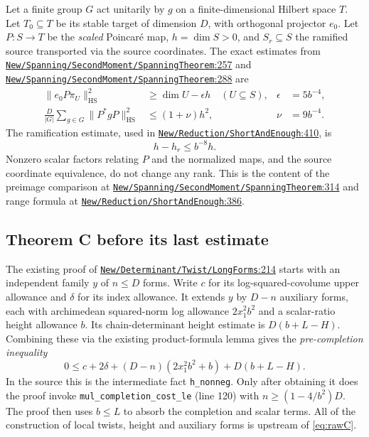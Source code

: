 \documentclass[11pt]{article}
\theoremstyle{remark}\newtheorem{remark}[theorem]{Remark}
\newcommand{\HS}{\mathrm{HS}}
\newcommand{\src}[2]{\href{https://github.com/lsernau/grh-lean/blob/72fead102f663d5c7a407964a13dc0cf9d977207/grh/src/#1.lean\#L#2}{\nolinkurl{#1}:#2}}
\begin{document}
Let a finite group $G$ act unitarily by $g$ on a finite-dimensional Hilbert space $T$. Let $T_0\subseteq T$ be its stable target of dimension $D$, with orthogonal projector $e_0$. Let $P:S\to T$ be the \emph{scaled} Poincar\'e map, $h=\dim S>0$, and $S_r\subseteq S$ the ramified source transported via the source coordinates. The exact estimates from \src{New/Spanning/SecondMoment/SpanningTheorem}{257} and \src{New/Spanning/SecondMoment/SpanningTheorem}{288} are
\begin{align}
\|e_0P\pi_U\|_{\HS}^2&\ge \dim U-\epsilon h \quad(U\subseteq S),&\epsilon&=5b^{-4},\label{eq:neariso}\\
\frac D{|G|}\sum_{g\in G}\|P^*gP\|_{\HS}^2&\le(1+\nu)h^2,&\nu&=9b^{-4}.\label{eq:moment}
\end{align}
The ramification estimate, used in \src{New/Reduction/ShortAndEnough}{410}, is
\begin{equation}\label{eq:ram} h-h_r\le b^{-8}h.\end{equation}
Nonzero scalar factors relating $P$ and the normalized maps, and the source coordinate equivalence, do not change any rank. This is the content of the preimage comparison at \src{New/Spanning/SecondMoment/SpanningTheorem}{314} and range formula at \src{New/Reduction/ShortAndEnough}{386}.

\subsection{Theorem C before its last estimate}
The existing proof of \src{New/Determinant/Twist/LongForms}{214} starts with an independent family $y$ of $n\le D$ forms. Write $c$ for its log-squared-covolume upper allowance and $\delta$ for its index allowance. It extends $y$ by $D-n$ auxiliary forms, each with archimedean squared-norm log allowance $2x_1^2b^2$ and a scalar-ratio height allowance $b$. Its chain-determinant height estimate is $D(b+L-H)$. Combining these via the existing product-formula lemma gives the \emph{pre-completion inequality}
\begin{equation}\label{eq:rawC}
0\le c+2\delta+(D-n)(2x_1^2b^2+b)+D(b+L-H).
\end{equation}
In the source this is the intermediate fact \texttt{h\_nonneg}. Only after obtaining it does the proof invoke \texttt{mul\_completion\_cost\_le} (line 120) with $n\ge(1-4/b^2)D$. The proof then uses $b\le L$ to absorb the completion and scalar terms. All of the construction of local twists, height and auxiliary forms is upstream of \eqref{eq:rawC}.
\end{document}
